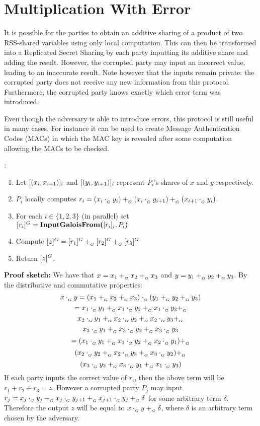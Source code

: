 \section{Multiplication With Error}

It is possible for the parties to obtain an additive sharing of a product
of two RSS-shared variables using only local computation.
This can then be transformed into a Replicated Secret Sharing 
by each party inputting its additive share and adding the result.
However, the corrupted party may input an incorrect value,
leading to an inaccurate result. 
Note however that the inputs remain private: the corrupted party
does not receive any new information from this protocol.
Furthermore, the corrupted party knows exactly which error term
was introduced. 

Even though the adversary is able to introduce errors, this protocol
is still useful in many cases.
For instance it can be used to create Message Authentication Codes (MACs)
in which the MAC key is revealed after some computation allowing the MACs to be checked.


\begin{protocol}
	:
	\begin{enumerate}
		\item Let $[(x_i, x_{i+1})]_{i}$ and
			$[(y_i, y_{i+1})]_{i}$
			represent $P_i$'s shares of $x$ and $y$
			respectively.
		\item $P_i$ locally computes 
			$r_i = (x_i \cdot_{_G} y_i) +_{_G} (x_i \cdot_{_G} y_{i+1})
				+_{_G} (x_{i+1} \cdot_{_G} y_i)$.
			\item For each $i \in \{1,2,3\}$ (in parallel) set\\
				$[r_i]^{G} = \textbf{InputGaloisFrom(}[r_i]_{i}, P_{i}\textbf{)}$
		\item Compute $[z]^{G} = [r_1]^{G} +_{_G} [r_2]^{G} +_{_G}
			[r_3]^{G}$
		\item Return $[z]^{G}$.
	\end{enumerate}
\end{protocol}

\textbf{Proof sketch:}
We have that $x = x_1 +_{_G} x_2 +_{_G} x_3$ and $y = y_1 +_{_G} y_2 +_{_G} y_3$.
By the distributive and commutative properties:\\
\[x \cdot_{_G} y = (x_1 +_{_G} x_2 +_{_G} x_3) \cdot_{_G} (y_1 +_{_G} y_2 +_{_G} y_3) \] 
	\[= x_1 \cdot_{_G} y_1 +_{_G} x_1 \cdot_{_G} y_2 +_{_G} x_1 \cdot_{_G} y_3 +_{_G} \]
	\[ x_2 \cdot_{_G} y_1 +_{_G} x_2 \cdot_{_G} y_2 +_{_G} x_2 \cdot_{_G} y_3 +_{_G} \]
	\[ x_3 \cdot_{_G} y_1 +_{_G} x_3 \cdot_{_G} y_2 +_{_G} x_3 \cdot_{_G} y_3 \]
	\[= (x_1 \cdot_{_G} y_1 +_{_G} x_1 \cdot_{_G} y_2 +_{_G} x_2 \cdot_{_G} y_1) +_{_G} \]
	\[(x_2 \cdot_{_G} y_2 +_{_G} x_2 \cdot_{_G} y_3 +_{_G} x_3 \cdot_{_G} y_2) +_{_G} \]
	\[(x_3 \cdot_{_G} y_3 +_{_G} x_3 \cdot_{_G} y_1 +_{_G} x_1 \cdot_{_G} y_3)\]
If each party inputs the correct value of $r_i$, then the above term
will be $r_1 + r_2 + r_3 = z$.
However a corrupted party $P_j$ may input 
$r_j = x_j \cdot_{_G} y_j +_{_G} x_j \cdot_{_G} y_{j+1} +_{_G} x_{j+1} \cdot_{_G} y_j +_{_G} \delta$
for some arbitrary term $\delta$.
Therefore the output $z$ will be equal to $x \cdot_{_G} y +_{_G} \delta$,
where $\delta$ is an arbitrary term chosen by the adversary.


